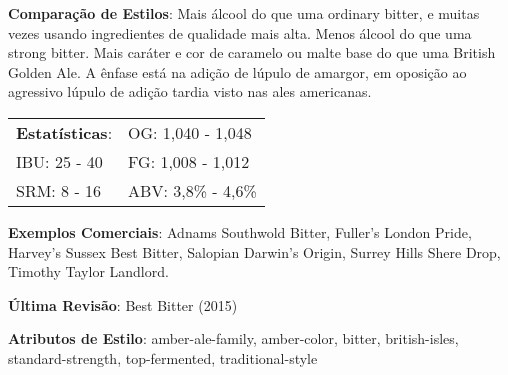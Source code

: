 \textbf{Comparação de Estilos}: Mais álcool do que uma ordinary bitter, e muitas vezes usando ingredientes de qualidade mais alta. Menos álcool do que uma strong bitter. Mais caráter e cor de caramelo ou malte base do que uma British Golden Ale. A ênfase está na adição de lúpulo de amargor, em oposição ao agressivo lúpulo de adição tardia visto nas ales americanas.

\begin{tabular}{@{}p{35mm}p{35mm}@{}}
  \textbf{Estatísticas}: & OG: 1,040 - 1,048 \\
  IBU: 25 - 40  & FG: 1,008 - 1,012  \\
  SRM: 8 - 16  & ABV: 3,8\% - 4,6\%
\end{tabular}

\textbf{Exemplos Comerciais}: Adnams Southwold Bitter, Fuller's London Pride, Harvey's Sussex Best Bitter, Salopian Darwin’s Origin, Surrey Hills Shere Drop, Timothy Taylor Landlord.

\textbf{Última Revisão}: Best Bitter (2015)

\textbf{Atributos de Estilo}: amber-ale-family, amber-color, bitter, british-isles, standard-strength, top-fermented, traditional-style
